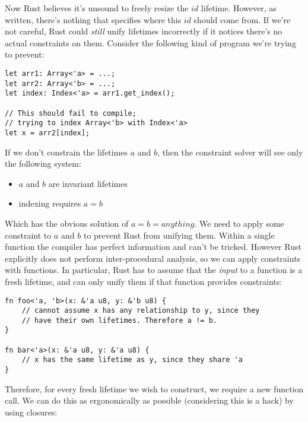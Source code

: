 Now Rust believes it's unsound to freely resize the $id$ lifetime. However, as
written, there's nothing that specifies where this $id$ should come from. If
we're not careful, Rust could \emph{still} unify lifetimes incorrectly if it notices
there's no actual constraints on them. Consider the following kind of program
we're trying to prevent:

\begin{verbatim}
let arr1: Array<'a> = ...;
let arr2: Array<'b> = ...;
let index: Index<'a> = arr1.get_index();

// This should fail to compile;
// trying to index Array<'b> with Index<'a>
let x = arr2[index];
\end{verbatim}

If we don't constrain the lifetimes $a$ and $b$, then the constraint solver
will see only the following system:

\begin{itemize}
 \item $a$ and $b$ are invariant lifetimes
 \item indexing requires $a = b$
\end{itemize}

Which has the obvious solution of $a = b = anything$. We need to apply some
constraint to $a$ and $b$ to prevent Rust from unifying them. Within a single
function the compiler has perfect information and can't be tricked. However
Rust explicitly does not perform inter-procedural analysis, so we can apply
constraints with functions. In particular, Rust has to assume that the \emph{input}
to a function is a fresh lifetime, and can only unify them if that function
provides constraints:

\begin{verbatim}
fn foo<'a, 'b>(x: &'a u8, y: &'b u8) {
    // cannot assume x has any relationship to y, since they
    // have their own lifetimes. Therefore a != b.
}

fn bar<'a>(x: &'a u8, y: &'a u8) {
    // x has the same lifetime as y, since they share 'a
}
\end{verbatim}

Therefore, for every fresh lifetime we wish to construct, we require a new
function call. We can do this as ergonomically as possible (considering this
is a hack) by using closures:

